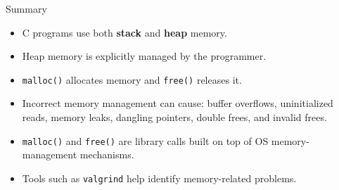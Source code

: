 \begin{frame}{Summary}
    \begin{itemize}
        \item C programs use both \textbf{stack} and \textbf{heap} memory.
        \item Heap memory is explicitly managed by the programmer.
        \item \texttt{malloc()} allocates memory and
              \texttt{free()} releases it.
        \item Incorrect memory management can cause:
              buffer overflows, uninitialized reads, memory leaks,
              dangling pointers, double frees, and invalid frees.
        \item \texttt{malloc()} and \texttt{free()} are library calls
              built on top of OS memory-management mechanisms.
        \item Tools such as \texttt{valgrind} help identify
              memory-related problems.
    \end{itemize}
\end{frame}